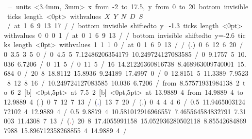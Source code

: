 \let\put\pictexput
\mbox{\beginpicture
\headingtoplotskip=\baselineskip
\setcoordinatesystem units <3.4mm, 3mm>
\setplotarea x from -2 to 17.5, y from 0 to 20
\axis bottom invisible ticks length <0pt>
  withvalues {$X$} {$Y$} {$N$} {$D$} {$S$} /  at 1 6 9 13 17 / /
\color{red}
\axis bottom invisible shiftedto y=-1.3 ticks length <0pt>
  withvalues {} {0} {0} {0} {1} /
  at 0 1 6 9 13 / /
\color{blue}
\axis bottom invisible shiftedto y=-2.6 ticks length <0pt>
  withvalues {} {1} {1} {1} {0} /
  at 0 1 6 9 13 / /
\color{black} %
\color{black} %
\setplotsymbol ({\normalsize .})
 0 6 12 6 20 /   %
 0 3.5 3 5 0 /   %
 0 4.5 5 7.12486206354179 10.249724127083585 /    %
 0 9.1757 5 10.036 6.7206 / %
 0 11 5 /       %
 0 11 5 /            %
 16 14.21226360816738 8.468963009740001 15.684 0 / %
 20 8 18.8112 15.8936 9.24189 17.4997 0 / %
 0 12.8151 5 11.3389 7.9523 8 12 8 16 / %
 10.249724127083585 10.036 6.7206 / %
\arrow <10pt> [.2,.67] from 8.57571931984138 2 to 6 2
\put {\small $\alpha$} [b]  <0pt,5pt> at 7.5 2
\put {\small $\beta$} [b]  <0pt,5pt> at 13.9889 4
\arrow <10pt> [.2,.67] from 14.9889 4 to 12.9889 4
\setplotsymbol ({\textcolor{gray}{\scriptsize .}})
 0 7 12 7 13 /         %
\setplotsymbol ({\textcolor{blue}{\scriptsize .}})
 13 7 20 /             %
\setplotsymbol ({\textcolor{gray}{\scriptsize .}})
 0 4 4 4 6 / %
 0.5
   11.946500312472102 4
   12.9889 4
/ %
 0.5
   9.8879 4
   10.581012916966557 7.465564584832791
   7.31003 11.4308
   7 13 / %
\setplotsymbol ({\textcolor{red}{\scriptsize .}})
 20
  8 17.4055991158
  15.052936280502118 8.855426848697988
  15.896712358268855 4
  14.9889 4
/ %
\endpicture}
\let\put\latexput
